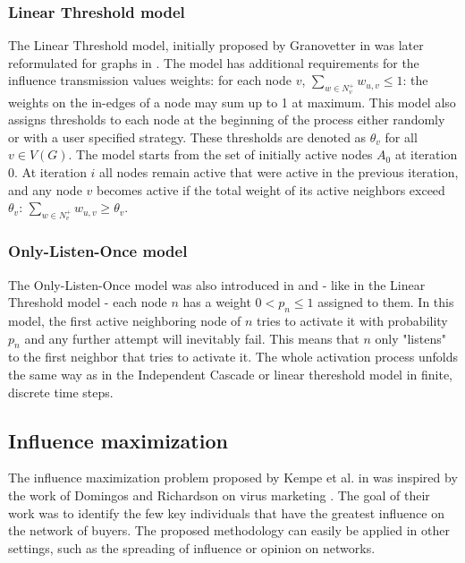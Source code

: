 \documentclass[pdflatex,sn-mathphys-num]{sn-jnl}
\begin{document}

\subsubsection{Linear Threshold model}

The Linear Threshold model, initially proposed by Granovetter in \cite{granovetter} was later reformulated for graphs in \cite{kempe}. The model has additional requirements for the influence transmission values weights: for each node $v$, $\sum_{w \in N^+_v} w_{u,v} \leq 1$: the weights on the in-edges of a node may sum up to 1 at maximum. This model also assigns thresholds to each node at the beginning of the process either randomly or with a user specified strategy. These thresholds are denoted as $\theta_v$ for all $v \in V(G)$. The model starts from the set of initially active nodes $A_0$ at iteration $0$. At iteration $i$ all nodes remain active that were active in the previous iteration, and any node $v$ becomes active if the total weight of its active neighbors exceed $\theta_v$: $\sum_{w \in N^+_v} w_{u,v} \geq \theta_v$.


\subsubsection{Only-Listen-Once model}

The Only-Listen-Once model was also introduced in \cite{kempe} and - like in the Linear Threshold model - each node $n$ has a weight $0 < p_{n} \leq 1$ assigned to them. In this model, the first active neighboring node of $n$ tries to activate it with probability $p_{n}$ and any further attempt will inevitably fail. This means that $n$ only "listens" to the first neighbor that tries to activate it. The whole activation process unfolds the same way as in the Independent Cascade or linear thereshold model in finite, discrete time steps.


\subsection{Influence maximization}\label{subsec_infmax}

The influence maximization problem proposed by Kempe et al. in \cite{kempe} was inspired by the work of Domingos and Richardson on virus marketing \cite{domingos}. The goal of their work was to identify the few key individuals that have the greatest influence on the network of buyers. The proposed methodology can easily be applied in other settings, such as the spreading of influence or opinion on networks.
\end{document}
